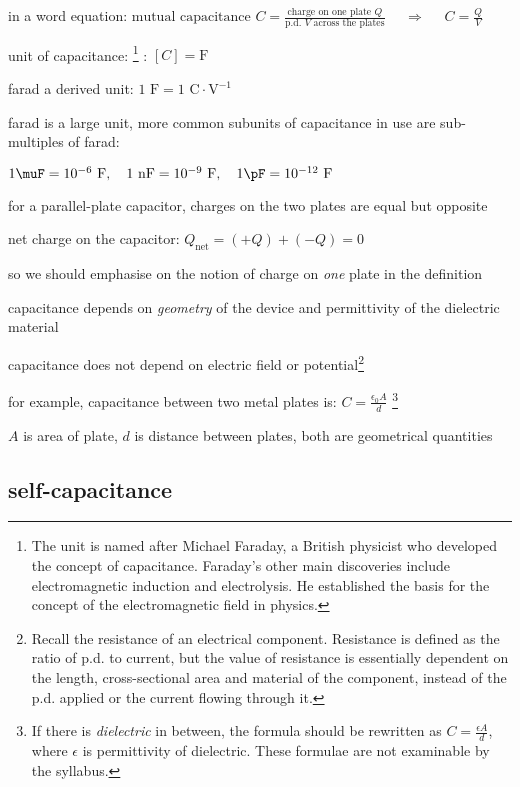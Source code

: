 in a word equation: $\text{mutual capacitance } C = \frac{\text{charge on one plate }Q }{\text{p.d. } V \text{ across the plates}}$ $\quad \Rightarrow \quad$ $\boxed{C = \frac{Q}{V}}$


\cmt unit of capacitance: 
\footnote{The unit is named after Michael Faraday, a British physicist who developed the concept of capacitance. Faraday's other main discoveries include electromagnetic induction and electrolysis. He established the basis for the concept of the electromagnetic field in physics.}
: $[C] = \text{F}$

farad a derived unit: $1 \text{ F} = 1 \text{ C}\cdot\text{V}^{-1}$

farad is a large unit, more common subunits of capacitance in use are sub-multiples of farad:

{
	
\centering

$1 \muF = 10^{-6} \text{ F}, \quad 1 \text{ nF} = 10^{-9} \text{ F}, \quad 1 \pF = 10^{-12} \text{ F}$

}

\cmt for a parallel-plate capacitor, charges on the two plates are equal but opposite

net charge on the capacitor: $Q_\text{net} = (+Q)+(-Q)=0$

so we should emphasise on the notion of charge on \emph{one} plate in the definition



\cmt capacitance depends on \emph{geometry} of the device and permittivity of the dielectric material

capacitance does not depend on electric field or potential\footnote{Recall the resistance of an electrical component. Resistance is defined as the ratio of p.d. to current, but the value of resistance is essentially dependent on the length, cross-sectional area and material of the component, instead of the p.d. applied or the current flowing through it.}

for example, capacitance between two metal plates is: $C=\frac{\epsilon_0 A}{d}$
\footnote{If there is \emph{dielectric} in between, the formula should be rewritten as $C = \frac{\epsilon A}{d}$, where $\epsilon$ is permittivity of dielectric. These formulae are not examinable by the syllabus.}

$A$ is area of plate, $d$ is distance between plates, both are geometrical quantities



\subsection{self-capacitance}

